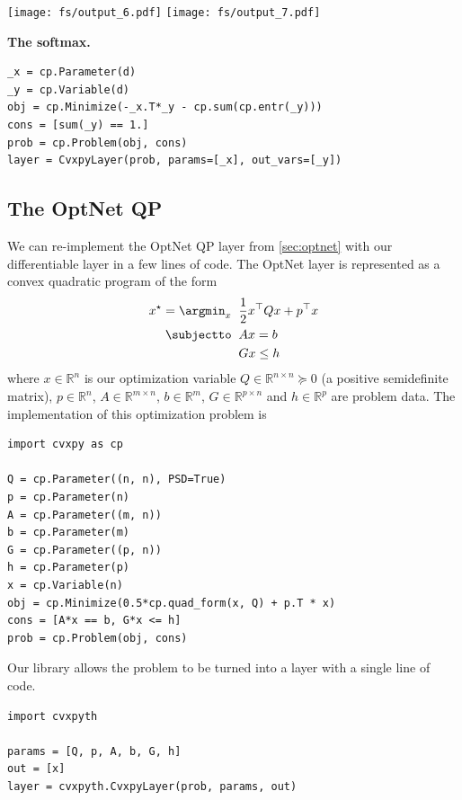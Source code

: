 \texttt{[image: fs/output\_6.pdf]}
\texttt{[image: fs/output\_7.pdf]}

\newpage
\textbf{The softmax.}
\begin{lstlisting}
_x = cp.Parameter(d)
_y = cp.Variable(d)
obj = cp.Minimize(-_x.T*_y - cp.sum(cp.entr(_y)))
cons = [sum(_y) == 1.]
prob = cp.Problem(obj, cons)
layer = CvxpyLayer(prob, params=[_x], out_vars=[_y])
\end{lstlisting}

\label{sec:cvxpyth:examples}
\subsection{The OptNet QP}

We can re-implement the OptNet QP layer from \cref{sec:optnet}
with our differentiable \cvxpy{} layer in a few lines of code.
The OptNet layer is represented as a convex quadratic program
of the form
\begin{equation}
\begin{split}
x^\star = \argmin_{x} \;\; & \frac{1} {2}x^\top Qx + p^\top x \\
\subjectto \;\; & Ax = b \\
& Gx \leq h \\
\end{split}
\label{eq:cvxpy-qp}
\end{equation}
where $x \in \mathbb{R}^n$ is our optimization variable
$Q \in \mathbb {R}^{n \times n} \succeq 0$
(a positive semidefinite matrix),
$p \in \mathbb {R}^n$,
$A\in \mathbb{R}^{m \times n}$,
$b \in \mathbb{R}^m$,
$G \in \mathbb{R}^ {p \times n}$ and
$h \in \mathbb{R}^{p}$ are problem data.
The \cvxpy{} implementation of this optimization problem is

\begin{lstlisting}
import cvxpy as cp

Q = cp.Parameter((n, n), PSD=True)
p = cp.Parameter(n)
A = cp.Parameter((m, n))
b = cp.Parameter(m)
G = cp.Parameter((p, n))
h = cp.Parameter(p)
x = cp.Variable(n)
obj = cp.Minimize(0.5*cp.quad_form(x, Q) + p.T * x)
cons = [A*x == b, G*x <= h]
prob = cp.Problem(obj, cons)
\end{lstlisting}

Our library allows the \cvxpy{} problem to be turned into
a layer with a single line of code.
\begin{lstlisting}
import cvxpyth

params = [Q, p, A, b, G, h]
out = [x]
layer = cvxpyth.CvxpyLayer(prob, params, out)
\end{lstlisting}

